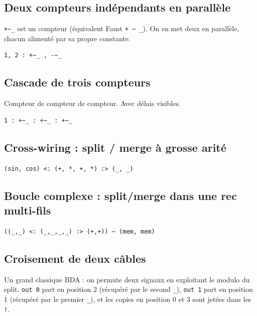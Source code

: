 \documentclass[11pt,a4paper]{article}
\theoremstyle{definition}
\begin{document}
\subsection{Deux compteurs indépendants en parallèle}

\texttt{+\textasciitilde{}\_} est un compteur (équivalent Faust \texttt{+ \textasciitilde{} \_}). On en met deux en
parallèle, chacun alimenté par sa propre constante.


\begin{lstlisting}
1, 2 : +~_ , -~_
\end{lstlisting}


\subsection{Cascade de trois compteurs}

Compteur de compteur de compteur. Avec délais visibles.


\begin{lstlisting}
1 : +~_ : +~_ : +~_
\end{lstlisting}


\subsection{Cross-wiring : split / merge à grosse arité}

\begin{lstlisting}
(sin, cos) <: (+, *, +, *) :> (_, _)
\end{lstlisting}


\subsection{Boucle complexe : split/merge dans une rec multi-fils}

\begin{lstlisting}
((_,_) <: (_,_,_,_) :> (+,+)) ~ (mem, mem)
\end{lstlisting}


\subsection{Croisement de deux câbles}

Un grand classique BDA : on permute deux signaux en exploitant le modulo
du split. \texttt{out 0} part en position 2 (récupéré par le second \texttt{\_}), \texttt{out 1}
part en position 1 (récupéré par le premier \texttt{\_}), et les copies en
position 0 et 3 sont jetées dans les \texttt{!}.
\end{document}
